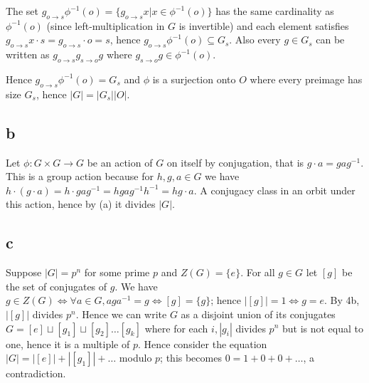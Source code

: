 \documentclass{article}
\def\inv{{-1}}
\begin{document}
The set $g_{o \to s} \phi^\inv(o) = \{g_{o \to s} x | x \in \phi^\inv(o)\}$ has the same cardinality as $\phi^\inv(o)$ (since left-multiplication in $G$ is invertible) and each element satisfies $g_{o \to s}x \cdot s = g_{o \to s} \cdot o = s$, hence $g_{o \to s}\phi^\inv(o) \subseteq G_s$. Also every $g \in G_s$ can be written as $g_{o \to s} g_{s \to o} g$ where $g_{s \to o}g \in \phi^\inv(o)$.

Hence $g_{o \to s}\phi^\inv(o) = G_s$ and $\phi$ is a surjection onto $O$ where every preimage has size $G_s$, hence $|G| = |G_s| |O|$.

\subsection*{b}

Let $\phi: G \times G \to G$ be an action of $G$ on itself by conjugation, that is $g \cdot a = gag^\inv$. This is a group action because for $h, g, a \in G$ we have $h \cdot (g \cdot a) = h \cdot g a g^\inv = hg ag^\inv h^\inv = hg \cdot a$. A conjugacy class in an orbit under this action, hence by (a) it divides $|G|$.

\subsection*{c}

Suppose $|G| = p^n$ for some prime $p$ and $Z(G) = \{e\}$. For all $g \in G$ let $[g]$ be the set of conjugates of $g$. We have $g \in Z(G) \iff \forall a \in G, a g a^\inv = g \iff [g] = \{g\}$; hence $|[g]| = 1 \iff g = e$. By 4b, $|[g]|$ divides $p^n$. Hence we can write $G$ as a disjoint union of its conjugates $G = [e] \sqcup [g_1] \sqcup [g_2] \ldots [g_k]$ where for each $i, |g_i|$ divides $p^n$ but is not equal to one, hence it is a multiple of $p$. Hence consider the equation $|G| = |[e]| + |[g_1]| + \ldots$ modulo $p$; this becomes $0 = 1 + 0 + 0 + \ldots$, a contradiction.



\end{document}
